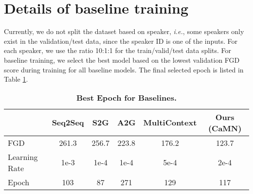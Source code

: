 \documentclass[runningheads]{llncs}
\begin{document}
\section{Details of baseline training}
Currently, we do not split the dataset based on speaker, \textit{i.e.}, some speakers only exist in the validation/test data, since the speaker ID is one of the inputs. For each speaker, we use the ratio 10:1:1 for the train/valid/test data splits. For baseline training, we select the best model based on the lowest validation FGD score during training for all baseline models. The final selected epoch is listed in Table \ref{tab:sptab1}. 
\begin{table}
\centering
\caption{\textbf{Best Epoch for Baselines.}}
\label{tab:sptab1}
\begin{tabular}{lccccc}
\multicolumn{1}{c}{} & Seq2Seq & S2G & A2G & MultiContext & Ours (CaMN)  \\ 
\hline
FGD                  & 261.3   &256.7     &223.8     &176.2         &123.7             \\
Learning Rate                  &1e-3         &1e-4     &1e-4     &5e-4              &2e-4              \\
Epoch                &103         &87     &271     &129             & 117            
\end{tabular}
\end{table}
\end{document}
